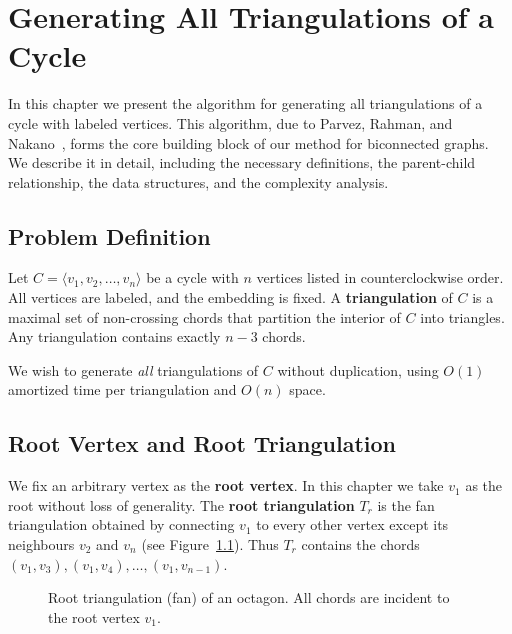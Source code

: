 
\chapter{Generating All Triangulations of a Cycle}
\label{ch:cycle_algorithm}

In this chapter we present the algorithm for generating all triangulations of a cycle with labeled vertices. 
This algorithm, due to Parvez, Rahman, and Nakano~\cite{parvez2011}, forms the core building block of our method for biconnected graphs. 
We describe it in detail, including the necessary definitions, the parent-child relationship, the data structures, and the complexity analysis.

\section{Problem Definition}
\label{sec:cycle_problem}

Let \(C = \langle v_1, v_2, \dots, v_n \rangle\) be a cycle with \(n\) vertices listed in counterclockwise order. 
All vertices are labeled, and the embedding is fixed. 
A \textbf{triangulation} of \(C\) is a maximal set of non-crossing chords that partition the interior of \(C\) into triangles. 
Any triangulation contains exactly \(n-3\) chords.

We wish to generate \emph{all} triangulations of \(C\) without duplication, using \(O(1)\) amortized time per triangulation and \(O(n)\) space.

\section{Root Vertex and Root Triangulation}
\label{sec:root_vertex}

We fix an arbitrary vertex as the \textbf{root vertex}. 
In this chapter we take \(v_1\) as the root without loss of generality. 
The \textbf{root triangulation} \(T_r\) is the fan triangulation obtained by connecting \(v_1\) to every other vertex except its neighbours \(v_2\) and \(v_n\) (see Figure~\ref{fig:fan_triangulation}). 
Thus \(T_r\) contains the chords \((v_1, v_3), (v_1, v_4), \dots, (v_1, v_{n-1})\).

\begin{figure}[htbp]
    \centering
    \caption{Root triangulation (fan) of an octagon. All chords are incident to the root vertex \(v_1\).}
    \label{fig:fan_triangulation}
\end{figure}

